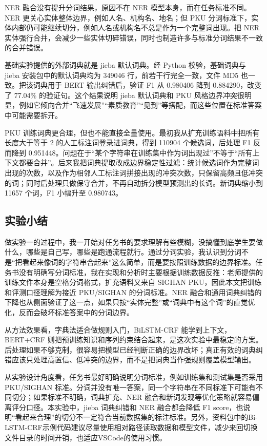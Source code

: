 \documentclass[12pt,a4paper,UTF8]{ctexart}
\newcommand{\xiaosi}{\fontsize{12pt}{18pt}\selectfont}
\newenvironment{reportbody}{\songti\xiaosi\onehalfspacing\sloppy}{}
\begin{document}
\begin{reportbody}
NER 融合没有提升分词结果，原因不在 NER 模型本身，而在任务标准不同。NER 更关心实体整体边界，例如人名、机构名、地名；但 PKU 分词标准下，实体内部仍可能继续切分，例如人名或机构名不总是作为一个完整词出现。把 NER 实体强行合并，会减少一些实体切碎错误，同时也制造许多与标准分词结果不一致的合并错误。

基础实验提供的外部词典就是 jieba 默认词典。经 Python 校验，基础词典与 jieba 安装包中的默认词典均为 349046 行，前若干行完全一致，文件 MD5 也一致。把该词典用于 BERT 输出纠错后，验证 F1 从 0.980406 降到 0.884290，改变了 77.04\% 的验证句。这个结果说明 jieba 默认词典和 PKU 风格边界冲突很明显，例如它倾向合并“飞速发展”“素质教育”“见到”等搭配，而这些位置在标准答案中可能需要拆开。

PKU 训练词典更合理，但也不能直接全量使用。最初我从扩充训练语料中把所有长度大于等于 2 的人工标注词登录进词典，得到 110904 个候选词，后处理 F1 反而降到 0.951448。问题在于“某个字符串在训练集中作为词出现过”不等于“所有上下文都要合并”。后来我把词典提取改成边界稳定性过滤：统计候选词作为完整词出现的次数，以及作为相邻人工标注词拼接出现的冲突次数，只保留高频且低冲突的词；同时后处理只做保守合并，不再自动拆分模型预测出的长词。新词典缩小到 11657 个词，F1 小幅升至 0.980743。

\subsection{实验小结}
做实验一的过程中，我一开始对任务书的要求理解有些模糊，没搞懂到底学生要做什么，哪些是自己写，哪些是跑通流程就行。通过分词实验，我认识到分词不是“把看起来像词的字符串合起来”这么简单，而是要按照训练数据的边界标准。任务书没有明确写分词标准，我在实现和分析时主要根据训练数据反推：老师提供的训练文件本身是空格分词格式，扩充语料又来自 SIGHAN PKU，因此本文把训练和评测口径理解为接近 PKU/SIGHAN 的分词标准。NER 融合和通用词典纠错的下降也从侧面验证了这一点，如果只按“实体完整”或“词典中有这个词”的直觉优化，反而会破坏标准答案中的分词边界。

从方法效果看，字典法适合做规则入门，BiLSTM-CRF 能学到上下文，BERT+CRF 则把预训练知识和序列约束结合起来，是这次实验中最稳定的方案。后处理如果不够克制，很容易把模型已经判断正确的边界改坏；真正有效的词典纠错应该只处理高置信、低冲突的边界，而不是把词典当作强规则覆盖模型输出。

从实验设计角度看，任务书最好明确说明分词标准，例如训练集和测试集是否采用 PKU/SIGHAN 标准。分词并没有唯一答案，同一个字符串在不同标准下可能有不同切分；如果标准不明确，词典扩充、NER 融合和新词发现等优化策略就容易偏离评分口径。本实验中，jieba 词典纠错和 NER 融合都会降低 F1 score，也说明“看起来合理”的切分不一定符合当前数据集的标注标准。另外，资料包中的Bi-LSTM-CRF示例代码建议尽量使用相对路径读取数据和模型文件，减少来回切换文件目录的时间开销，也适应VSCode的使用习惯。


\end{reportbody}
\end{document}
